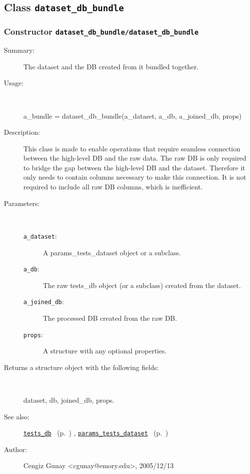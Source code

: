 \subsection{Class \texttt{dataset\_db\_bundle}}%
%
\label{ref_dataset_db_bundle}%
\hypertarget{ref_dataset_db_bundle}{}%
\subsubsection[Constructor \texttt{dataset\_db\_bundle}]{Constructor \texttt{dataset\_db\_bundle/dataset\_db\_bundle}}%
%
\label{ref_dataset_db_bundle__dataset_db_bundle}%
\hypertarget{ref_dataset_db_bundle__dataset_db_bundle}{}%
\begin{description}
\item[Summary:]The dataset and the DB created from it bundled together.
%
\item[Usage:]~%
\begin{lyxcode}%
a\_bundle = dataset\_db\_bundle(a\_dataset, a\_db, a\_joined\_db, props)
%
\end{lyxcode}%
%
\item[Description:]%
This class is made to enable operations that require seamless connection between 
 the high-level DB and the raw data. The raw DB is only required to bridge the gap 
 between the high-level DB and the dataset. Therefore it only needs to contain 
 columns necessary to make this connection. It is not required to include all 
 raw DB columns, which is inefficient.
\item[Parameters:]~
\begin{description}%
\item[\texttt{a\_dataset}:]
 A params\_tests\_dataset object or a subclass.
\item[\texttt{a\_db}:]
 The raw tests\_db object (or a subclass) created from the dataset.
\item[\texttt{a\_joined\_db}:]
 The processed DB created from the raw DB.
\item[\texttt{props}:]
 A structure with any optional properties.
\end{description}%
%
\item[Returns a structure object with the following fields:]~

	dataset, db, joined\_db, props.
%
%
\item[See also:]%
\hyperlink{ref_tests_db}{\texttt{tests\_db}}%
\ (p.~\pageref{ref_tests_db})%
%
, \hyperlink{ref_params_tests_dataset}{\texttt{params\_tests\_dataset}}%
\ (p.~\pageref{ref_params_tests_dataset})%
%
%
\item[Author:]%
Cengiz Gunay <cgunay@emory.edu>, 2005/12/13%
\end{description}
\methodline%
